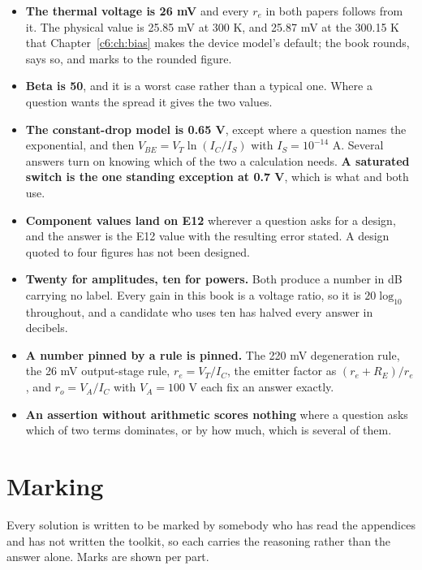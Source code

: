 \begin{itemize}
  \item \textbf{The thermal voltage is 26 mV} and every $r_e$ in both papers follows from it. The physical value is 25.85 mV at 300 K, and 25.87 mV at the 300.15 K that Chapter~\ref{c6:ch:bias} makes the device model's default; the book rounds, says so, and marks to the rounded figure.
  \item \textbf{Beta is 50}, and it is a worst case rather than a typical one. Where a question wants the spread it gives the two values.
  \item \textbf{The constant-drop model is 0.65 V}, except where a question names the exponential, and then $V_{BE} = V_T \ln(I_C/I_S)$ with $I_S = 10^{-14}$ A. Several answers turn on knowing which of the two a calculation needs. \textbf{A saturated switch is the one standing exception at 0.7 V}, which is what  and  both use.
  \item \textbf{Component values land on E12} wherever a question asks for a design, and the answer is the E12 value with the resulting error stated. A design quoted to four figures has not been designed.
  \item \textbf{Twenty for amplitudes, ten for powers.} Both produce a number in dB carrying no label. Every gain in this book is a voltage ratio, so it is $20\log_{10}$ throughout, and a candidate who uses ten has halved every answer in decibels.
  \item \textbf{A number pinned by a rule is pinned.} The 220 mV degeneration rule, the 26 mV output-stage rule, $r_e = V_T/I_C$, the emitter factor as $(r_e + R_E)/r_e$, and $r_o = V_A/I_C$ with $V_A = 100$ V each fix an answer exactly.
  \item \textbf{An assertion without arithmetic scores nothing} where a question asks which of two terms dominates, or by how much, which is several of them.
\end{itemize}

\section*{Marking}

Every solution is written to be marked by somebody who has read the appendices and has not written the toolkit, so each carries the reasoning rather than the answer alone. Marks are shown per part.

